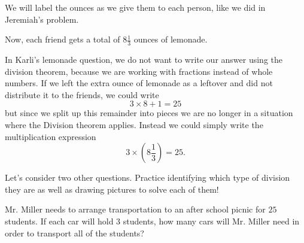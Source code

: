 \documentclass{ximera}
\begin{document}
\begin{question}
\begin{explanation}
We will label the ounces as we give them to each person, like we did in Jeremiah's problem.
\begin{image}  \end{image}
Now, each friend gets a total of $8 \frac{1}{3}$ ounces of lemonade.

\end{explanation}
\end{question}
In Karli's lemonade question, we do not want to write our answer using the division theorem, because we are working with fractions instead of whole numbers. If we left the extra ounce of lemonade as a leftover and did not distribute it to the friends, we could write
\[
3 \times 8 + 1 = 25
\]
but since we split up this remainder into pieces we are no longer in a situation where the Division theorem applies. Instead we could simply write the multiplication expression
\[
3 \times \left ( 8 \frac{1}{3} \right ) = 25.
\]


Let's consider two other questions. Practice identifying which type of division they are as well as drawing pictures to solve each of them!
\begin{question}
Mr. Miller needs to arrange transportation to an after school picnic for $25$ students. If each car will hold $3$ students, how many cars will Mr. Miller need in order to transport all of the students?
\begin{multipleChoice}
\end{multipleChoice}
\end{question}
\end{document}
